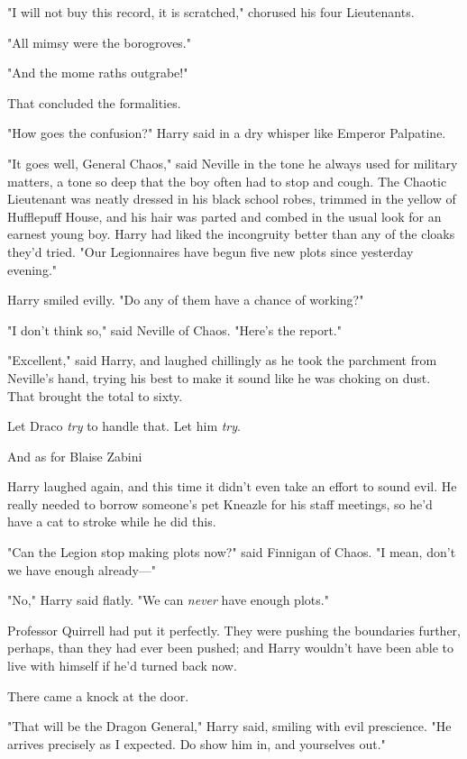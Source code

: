 "I will not buy this record, it is scratched," chorused his four Lieutenants.

"All mimsy were the borogroves."

"And the mome raths outgrabe!"

That concluded the formalities.

"How goes the confusion?" Harry said in a dry whisper like Emperor Palpatine.

"It goes well, General Chaos," said Neville in the tone he always used for
military matters, a tone so deep that the boy often had to stop and cough. The
Chaotic Lieutenant was neatly dressed in his black school robes, trimmed in the
yellow of Hufflepuff House, and his hair was parted and combed in the usual
look for an earnest young boy. Harry had liked the incongruity better than any
of the cloaks they'd tried. "Our Legionnaires have begun five new plots since
yesterday evening."

Harry smiled evilly. "Do any of them have a chance of working?"

"I don't think so," said Neville of Chaos. "Here's the report."

"Excellent," said Harry, and laughed chillingly as he took the parchment from
Neville's hand, trying his best to make it sound like he was choking on dust.
That brought the total to sixty.

Let Draco \emph{try} to handle that. Let him \emph{try}.

And as for Blaise Zabini{\el}

Harry laughed again, and this time it didn't even take an effort to sound evil.
He really needed to borrow someone's pet Kneazle for his staff meetings, so
he'd have a cat to stroke while he did this.

"Can the Legion stop making plots now?" said Finnigan of Chaos. "I mean, don't
we have enough already\mbox{---}"

"No," Harry said flatly. "We can \emph{never} have enough plots."

Professor Quirrell had put it perfectly. They were pushing the boundaries
further, perhaps, than they had ever been pushed; and Harry wouldn't have been
able to live with himself if he'd turned back now.

There came a knock at the door.

"That will be the Dragon General," Harry said, smiling with evil prescience.
"He arrives precisely as I expected. Do show him in, and yourselves out."

